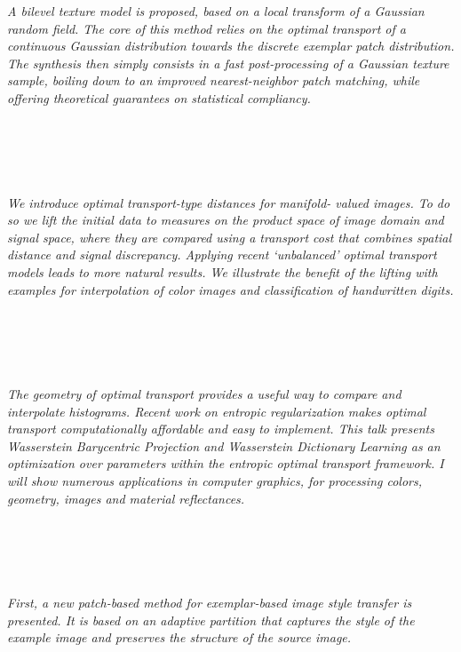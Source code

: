   \begin{multicols}{2}
      \textit{A bilevel texture model is proposed, based on a local transform of a Gaussian random field. The core of this method relies on the optimal transport of a continuous Gaussian distribution towards the discrete exemplar patch distribution. The synthesis then simply consists in a fast post-processing of a Gaussian texture sample, boiling down to an improved nearest-neighbor patch matching, while offering theoretical guarantees on statistical compliancy. }\\
\\ 
        \\
        \\\\
\\
      \textit{We introduce optimal transport-type distances for manifold-
valued images. To do so we lift the initial data to measures on the product space of image domain and signal space, where they are compared using a transport cost that combines spatial distance and signal discrepancy. Applying recent ‘unbalanced’ optimal transport models leads to more natural results. We illustrate the benefit of the lifting with examples for interpolation of color images and classification of handwritten digits.
}\\
\\ 
        \\
        \\\\
\\
      \textit{The geometry of optimal transport provides a useful way to compare and interpolate histograms. Recent work on entropic regularization makes optimal transport computationally affordable and easy to implement. This talk presents Wasserstein Barycentric Projection and Wasserstein Dictionary Learning as an optimization over parameters within the entropic optimal transport framework. I will show numerous applications in computer graphics, for processing colors, geometry, images and material reflectances.}\\
\\ 
        \\
        \\\\
\\
      \textit{First, a new patch-based method for exemplar-based image style transfer is presented. It is based on an adaptive partition that captures the style of the example image and preserves the structure of the source image.
}
\end{multicols}

